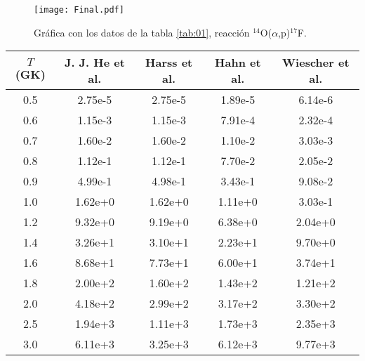 \documentclass[fleqn,11pt]{SelfArx} %
\begin{document}
\begin{figure}[h!] \centering
	\texttt{[image: Final.pdf]}
	\caption{Gráfica con los datos de la tabla \ref{tab:01}, reacción  $^{14}$O($\alpha$,p)$^{17}$F.}
	\label{Fig:12}
\end{figure}

\begin{table*}[t]
	\centering
	\caption{Ratio de reacciones $^{14}\text{O}(\alpha, p)^{17}\text{F}$ en unidades de $\text{cm}^3\text{s}^{-1}\text{mol}^{-1}$.}
	\begin{tabular}{c|c|c|c|c}
		\toprule
		$T$ (GK) & {J. J. He et al. \cite{Astrophysics}} & {Harss et al. \cite{Astrophysics1}} & {Hahn et al. \cite{Astrophysics2}} & {Wiescher et al. \cite{Astrophysics3}} \\
		\midrule
		0.5 & 2.75e-5 & 2.75e-5 & 1.89e-5 & 6.14e-6 \\
		0.6 & 1.15e-3 & 1.15e-3 & 7.91e-4 & 2.32e-4 \\
		0.7 & 1.60e-2 & 1.60e-2 & 1.10e-2 & 3.03e-3 \\
		0.8 & 1.12e-1 & 1.12e-1 & 7.70e-2 & 2.05e-2 \\
		0.9 & 4.99e-1 & 4.98e-1 & 3.43e-1 & 9.08e-2 \\
		1.0 & 1.62e+0 & 1.62e+0 & 1.11e+0 & 3.03e-1 \\
		1.2 & 9.32e+0 & 9.19e+0 & 6.38e+0 & 2.04e+0 \\
		1.4 & 3.26e+1 & 3.10e+1 & 2.23e+1 & 9.70e+0 \\
		1.6 & 8.68e+1 & 7.73e+1 & 6.00e+1 & 3.74e+1 \\
		1.8 & 2.00e+2 & 1.60e+2 & 1.43e+2 & 1.21e+2 \\
		2.0 & 4.18e+2 & 2.99e+2 & 3.17e+2 & 3.30e+2 \\
		2.5 & 1.94e+3 & 1.11e+3 & 1.73e+3 & 2.35e+3 \\
		3.0 & 6.11e+3 & 3.25e+3 & 6.12e+3 & 9.77e+3 \\
		\bottomrule
	\end{tabular}
	\label{tab:01}
\end{table*}








\end{document}
